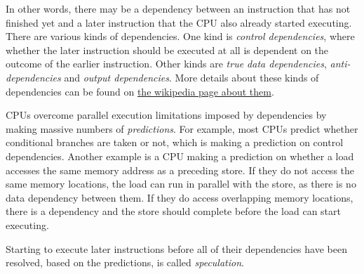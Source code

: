 \documentclass[a4paper,]{report}
\begin{document}
In other words, there may be a dependency between an instruction that
has not finished yet and a later instruction that the CPU also already
started executing. There are various kinds of dependencies. One kind is
\emph{control dependencies}, where whether
the later instruction should be executed at all is dependent on the
outcome of the earlier instruction. Other kinds are \emph{true data
dependencies}, \emph{anti-dependencies} and
\emph{output dependencies}. More details about
these kinds of dependencies can be found on
\href{https://en.wikipedia.org/wiki/Data_dependency}{the wikipedia page
about them}.

CPUs overcome parallel execution limitations imposed by dependencies by
making massive numbers of \emph{predictions}. For
example, most CPUs predict whether conditional branches are taken or
not, which is making a prediction on control dependencies. Another
example is a CPU making a prediction on whether a load accesses the same
memory address as a preceding store. If they do not access the same
memory locations, the load can run in parallel with the store, as there
is no data dependency between them. If they do access overlapping memory
locations, there is a dependency and the store should complete before
the load can start executing.

Starting to execute later instructions before all of their dependencies
have been resolved, based on the predictions, is called
\emph{speculation}.
\end{document}
